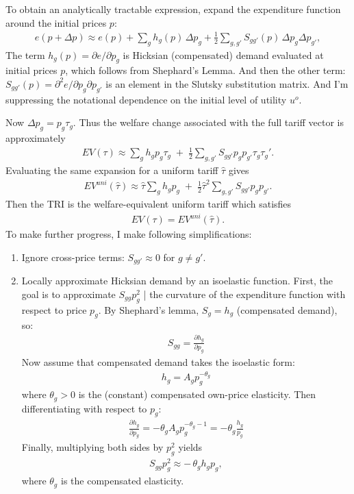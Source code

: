 \documentclass[12pt,pdftex]{article}
\begin{document}
\begin{onehalfspacing}
To obtain an analytically tractable expression, expand the expenditure function around the initial prices $p$:
\begin{align}
e(p+\Delta p) \approx e(p) + \sum_g h_g(p)\,\Delta p_g + \frac{1}{2} \sum_{g,{g'}} S_{g{g'}}(p)\,\Delta p_g \Delta p_{g'},
\end{align}
The term $h_g(p) = \partial e/\partial p_g$ is Hicksian (compensated) demand evaluated at initial prices $p$, which follows from Shephard's Lemma. And then the other term: $S_{g{g'}}(p) = \partial^2 e/\partial p_g \partial p_{g'}$ is an element in the Slutsky substitution matrix. And I'm suppressing the notational dependence on the initial level of utility $u^o$.

Now $\Delta p_g = p_g \tau_g$. Thus the welfare change associated with the full tariff vector is approximately
\begin{align}
EV(\tau)
\approx
\sum_g h_g p_g \tau_g
\;+\;
\frac{1}{2} \sum_{g,{g'}} S_{g{g'}} p_g p_{g'} \tau_g \tau_g'.
\end{align}
Evaluating the same expansion for a uniform tariff $\hat{\tau}$ gives
\begin{align}
EV^{uni}(\hat{\tau})
\approx
\hat{\tau} \sum_g h_g p_g
\;+\;
\frac{1}{2} \hat{\tau}^2 \sum_{g,{g'}} S_{g{g'}} p_g p_{g'}.
\end{align}
Then the TRI is the welfare-equivalent uniform tariff which satisfies
\begin{align}
EV(\tau) = EV^{uni}(\hat{\tau}).
\end{align}
To make further progress, I make following simplifications:
\begin{enumerate}
\item Ignore cross-price terms: $S_{gg'}\approx 0$ for $g\neq g'$.

\item Locally approximate Hicksian demand by an isoelastic function. First, the goal is to approximate $S_{gg} p_g^2$ | the curvature of the expenditure function with respect to price $p_g$. By Shephard's lemma, $S_g = h_g$ (compensated demand), so:
\begin{align}
S_{gg} = \frac{\partial h_g}{\partial p_g}
\end{align}
Now assume that compensated demand takes the isoelastic form:
\begin{align}
h_g = A_g p_g^{-\theta_g}
\end{align}
where $\theta_g > 0$ is the (constant) compensated own-price elasticity. Then differentiating with respect to $p_g$:
\begin{align}
\frac{\partial h_g}{\partial p_g} = -\theta_g A_g p_g^{-\theta_g - 1} = -\theta_g \frac{h_g}{p_g}
\end{align}
Finally, multiplying both sides by $p_g^2$ yields
\begin{align}
    S_{gg} p_g^2 \approx -\,\theta_g h_g p_g,
\end{align}
where $\theta_g$ is the compensated elasticity.


\end{enumerate}
\end{onehalfspacing}
\end{document}
